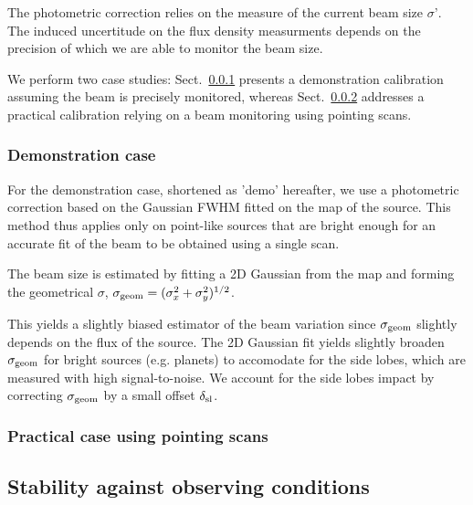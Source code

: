 The photometric correction relies on the measure of the current beam
size $\sigma ’$. The induced uncertitude on the flux density
measurments depends on the precision of which we are able to monitor
the beam size. 

We perform two case studies: Sect.~\ref{se:photocorr_demo} presents a demonstration
calibration assuming the beam is precisely monitored, whereas
Sect.~\ref{se:photocorr_pointing} addresses a practical calibration relying
on a beam monitoring using pointing scans. 

\subsubsection{Demonstration case}
\label{se:photocorr_demo}

For the demonstration case, shortened as 'demo' hereafter, we use a
photometric correction based on the Gaussian FWHM fitted on the map
of the source. This method thus applies only on point-like
sources that are bright enough for an accurate fit of the beam to be
obtained using a single scan.  

The beam size is estimated by fitting a 2D Gaussian from the map and
forming the geometrical $\sigma$, $\sigma_{\rm{geom}} = (\sigma_x^2 +
\sigma_y^2)^{1/2}$.  

This yields a slightly biased estimator of the beam variation since
$\sigma_{\rm geom}$ slightly depends on the flux of the source. The 2D
Gaussian fit yields slightly broaden $\sigma_{\rm{geom}}$ for bright
sources (e.g. planets) to accomodate for the side lobes, which are
measured with high signal-to-noise. We account for the side lobes
impact by correcting $\sigma_{\rm{geom}}$ by a small offset
$\delta_{\rm{sl}}$.





\subsubsection{Practical case using pointing scans}
\label{se:photocorr_pointing}





\subsection{Stability against observing conditions}


